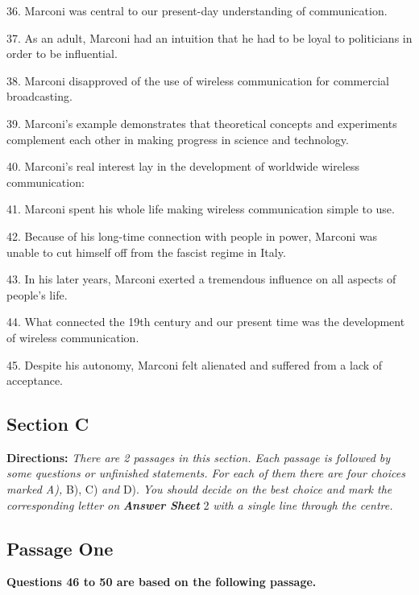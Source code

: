 \documentclass[UTF8,11pt]{ctexart}
\begin{document}
36. Marconi was central to our present-day understanding of communication.


37. As an adult, Marconi had an intuition that he had to be loyal to politicians in order to be influential.


38. Marconi disapproved of the use of wireless communication for commercial broadcasting.


39. Marconi's example demonstrates that theoretical concepts and experiments complement each other in making progress in science and technology.


40. Marconi's real interest lay in the development of worldwide wireless communication:


41. Marconi spent his whole life making wireless communication simple to use.


42. Because of his long-time connection with people in power, Marconi was unable to cut himself off from the fascist regime in Italy.


43. In his later years, Marconi exerted a tremendous influence on all aspects of people's life.


44. What connected the 19th century and our present time was the development of wireless communication.


45. Despite his autonomy, Marconi felt alienated and suffered from a lack of acceptance.


\subsection*{\textbf{Section C}}


\textbf{Directions: }\textit{There are 2 passages in this section. Each passage is followed by some questions or unfinished} \textit{statements. For each of them there are four choices marked A), }B), C) \textit{and }D). \textit{You should decide on the} \textit{best choice and mark the corresponding letter on }\textbf{\textit{Answer Sheet }}2 \textit{with a single line through the centre.}


\subsection*{\textbf{Passage One}}


\textbf{Questions 46 to 50 are based on the following passage.}
\end{document}
